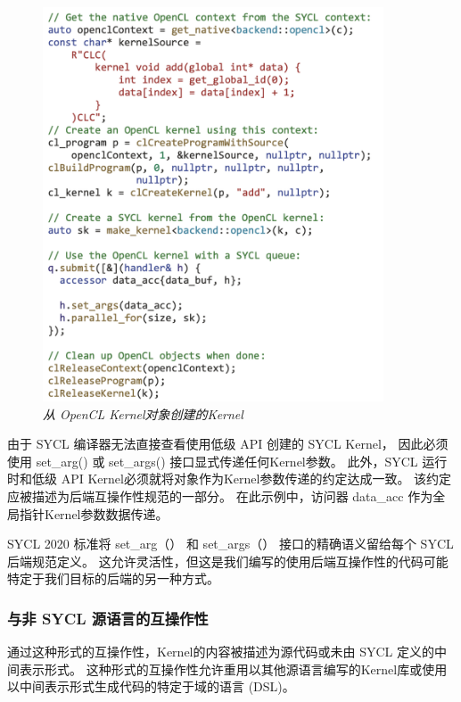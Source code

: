\begin{figure}[H]
	\centering
	\includegraphics[width=0.9\textwidth]{figs/F20.9.png}
	\caption{\textit{从 OpenCL Kernel对象创建的Kernel }}
\end{figure}

由于 SYCL 编译器无法直接查看使用低级 API 创建的 SYCL Kernel，
因此必须使用 set\_arg() 或 set\_args() 接口显式传递任何Kernel参数。 
此外，SYCL 运行时和低级 API Kernel必须就将对象作为Kernel参数传递的约定达成一致。 
该约定应被描述为后端互操作性规范的一部分。 在此示例中，访问器 data\_acc 作为全局指针Kernel参数数据传递。

\begin{remark}
	SYCL 2020 标准将 set\_arg（） 和 set\_args（） 接口的精确语义留给每个 SYCL 后端规范定义。
	这允许灵活性，但这是我们编写的使用后端互操作性的代码可能特定于我们目标的后端的另一种方式。
\end{remark}

\subsubsection{与非 SYCL 源语言的互操作性}
通过这种形式的互操作性，Kernel的内容被描述为源代码或未由 SYCL 定义的中间表示形式。 
这种形式的互操作性允许重用以其他源语言编写的Kernel库或使用以中间表示形式生成代码的特定于域的语言 (DSL)。

